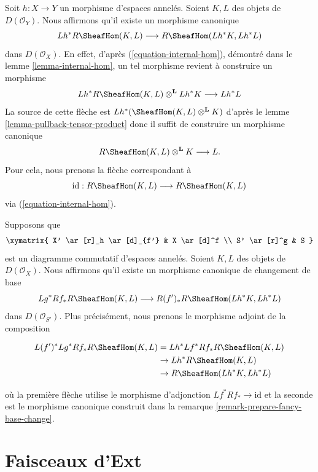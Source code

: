 {\begin{remark}
Soit $h : X \to Y$ un morphisme d'espaces annelés. Soient $K, L$ des objets de $D(\mathcal{O}_Y)$. Nous affirmons qu'il existe un morphisme canonique
$$
Lh^*R\SheafHom(K, L) \longrightarrow R\SheafHom(Lh^*K, Lh^*L)
$$
dans $D(\mathcal{O}_X)$. En effet, d'après (\ref{equation-internal-hom}), démontré dans le lemme \ref{lemma-internal-hom},
un tel morphisme revient à construire un morphisme
$$
Lh^*R\SheafHom(K, L) \otimes^\mathbf{L} Lh^*K \longrightarrow Lh^*L
$$
La source de cette flèche est $Lh^*(\SheafHom(K, L) \otimes^\mathbf{L} K)$
d'après le lemme \ref{lemma-pullback-tensor-product}
donc il suffit de construire un morphisme canonique
$$
R\SheafHom(K, L) \otimes^\mathbf{L} K \longrightarrow L.
$$
Pour cela, nous prenons la flèche correspondant à
$$
\text{id} :
R\SheafHom(K, L)
\longrightarrow
R\SheafHom(K, L)
$$
via (\ref{equation-internal-hom}).

\end{remark}

\begin{remark}

\label{remark-fancy-base-change}

Supposons que
$$
\xymatrix{
X' \ar[r]_h \ar[d]_{f'} &
X \ar[d]^f \\
S' \ar[r]^g &
S
}
$$
est un diagramme commutatif d'espaces annelés. Soient $K, L$ des objets de $D(\mathcal{O}_X)$. Nous affirmons qu'il existe un morphisme canonique de changement de base
$$
Lg^*Rf_*R\SheafHom(K, L)
\longrightarrow
R(f')_*R\SheafHom(Lh^*K, Lh^*L)
$$
dans $D(\mathcal{O}_{S'})$. Plus précisément, nous prenons le morphisme adjoint de la composition

\begin{align*}
L(f')^*Lg^*Rf_*R\SheafHom(K, L)
& =
Lh^*Lf^*Rf_*R\SheafHom(K, L) \\
& \to
Lh^*R\SheafHom(K, L) \\
& \to
R\SheafHom(Lh^*K, Lh^*L)
\end{align*}

où la première flèche utilise le morphisme d'adjonction
$Lf^*Rf_* \to \text{id}$ et la seconde est le morphisme canonique construit dans la remarque \ref{remark-prepare-fancy-base-change}.

\end{remark}
\section{Faisceaux d'Ext}

\label{section-ext}

}
